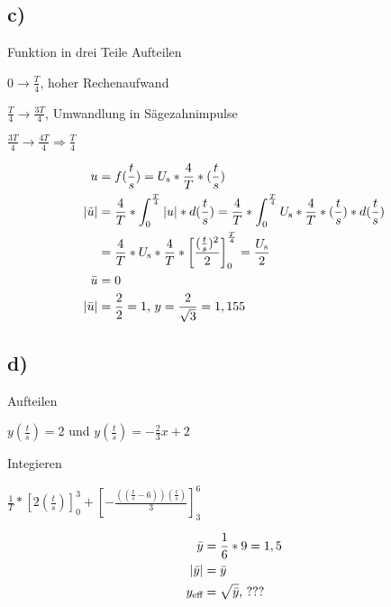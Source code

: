 \documentclass[../../document.tex]{subfiles}
\begin{document}
\subsection*{c)}

Funktion in drei Teile Aufteilen

\(0 \rightarrow \frac{T}{4}\), hoher Rechenaufwand

\(\frac{T}{4} \rightarrow \frac{3T}{4}\), Umwandlung in Sägezahnimpulse

\(\frac{3T}{4} \rightarrow \frac{4T}{4} \Rightarrow \frac{T}{4}\)

\begin{equation*}
    \begin{split}
        u &= f(\frac{t}{s}) = U_{\textrm{s}} * \frac{4}{T} * (\frac{t}{s})\\
        \left\lvert\bar{u}\right\rvert &= \frac{4}{T} * \int_{0}^{\frac{T}{4}} \left\lvert u \right\rvert * d (\frac{t}{s}) = \frac{4}{T} * \int_{0}^{\frac{T}{4}} U_{\textrm{s}} * \frac{4}{T} * (\frac{t}{s}) * d (\frac{t}{s}) \\
        &= \frac{4}{T} * U_{\textrm{s}} * \frac{4}{T} * \left[ \frac{(\frac{t}{s})^2}{2} \right]_0^\frac{T}{4} = \frac{U_{\textrm{s}}}{2} \\
        \bar{u} &= 0 \\
        \left\lvert \bar{u} \right\rvert &= \frac{2}{2} = 1 \text{, } y = \frac{2}{\sqrt{3}} = 1,155\\
    \end{split}
\end{equation*}

\subsection*{d)}

Aufteilen

\(y(\frac{t}{s}) = 2\) und \(y(\frac{t}{s}) = -\frac{2}{3}x + 2\)

Integieren

\(\frac{1}{T} * \left[ 2 ( \frac{t}{s} ) \right]_0^3 + \left[ - \frac{((\frac{t}{s} - 6))(\frac{t}{s})}{3} \right]_3^6 \)

\begin{equation*}
    \begin{split}
        \bar{y} &= \frac{1}{6} * 9 = 1,5\\
        \left\lvert \bar{y} \right\rvert &= \bar{y}\\
        y_{\textrm{eff}} &= \sqrt{\bar{y}}\text{, ???}\\
    \end{split}
\end{equation*}
\end{document}
